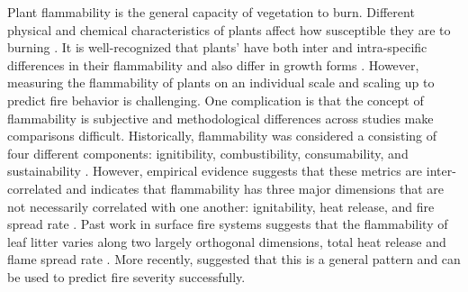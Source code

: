 \documentclass[12pt]{report}
\begin{document}
Plant flammability is the general capacity of vegetation to burn. Different physical and chemical characteristics of plants affect how susceptible they are to burning \citep{bond1996fire}. It is well-recognized that plants' have both inter and intra-specific differences in their flammability \citep{pausas2012fire, battersby2017exploring, cui2020shoot, cui2022intraspecific} and also differ in growth forms \citep{calitz2015investigating, jaureguiberry2011device, zanzarini2022flammability, potts2022growth, cui2020shoot, wyse2016quantitative}. However, measuring the flammability of plants on an individual scale and scaling up to predict fire behavior is challenging. One complication is that the concept of flammability is subjective \citep{gill2005flammability} and methodological differences across studies make comparisons difficult. Historically, flammability was considered a consisting of four different components: ignitibility, combustibility, consumability, and sustainability \citep{anderson1970forest, martin1993assessing}. However, empirical evidence suggests that these metrics are inter-correlated and indicates that flammability has three major dimensions that are not necessarily correlated with one another: ignitability, heat release, and fire spread rate \citep{pausas2017flammability}. Past work in surface fire systems suggests that the flammability of leaf litter varies along two largely orthogonal dimensions, total heat release and flame spread rate \citep{de2012leaf}. More recently, \citep{prior2018conceptualizing} suggested that this is a general pattern and can be used to predict fire severity successfully.
\end{document}
